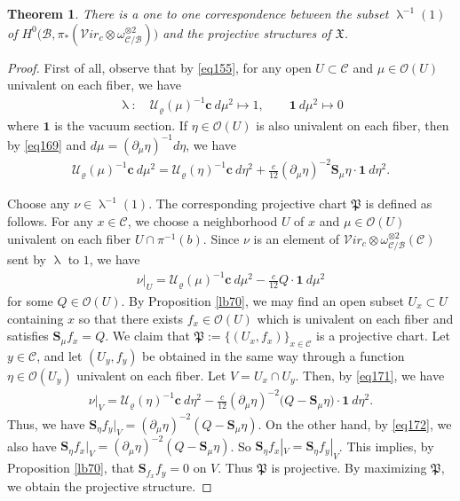 \documentclass[12pt,b5paper,notitlepage]{report}
\theoremstyle{definition}
\theoremstyle{plain}
\newtheorem{thm}[df]{Theorem}
\newcommand{\fk}{\mathfrak}
\newcommand{\mc}{\mathcal}
\newcommand{\id}{\mathbf{1}}
\newcommand{\scr}{\mathscr}
\newcommand{\cbf}{\mathbf c}
\newcommand{\svir}{\mathcal V\!\mathit{ir}}
\newcommand{\Sbf}{\mathbf{S}}
\numberwithin{equation}{section}
\begin{document}
\begin{thm}\label{lb72}
There is a one to one correspondence between the subset $\uplambda^{-1}(1)$ of $H^0\big(\mc B,\pi_*(\svir_c\otimes \omega_{\mc C/\mc B}^{\otimes 2})\big)$ and  the projective structures of $\fk X$.
\end{thm}

\begin{proof}
First of all, observe that by \eqref{eq155}, for any open $U\subset \mc C$ and $\mu\in\scr O(U)$ univalent on each fiber, we have
\begin{gather*}
\uplambda:\quad \mc U_\varrho(\mu)^{-1}\cbf ~d\mu^2\mapsto 1,\qquad \id ~d\mu^2\mapsto 0
\end{gather*}
where $\id$ is the vacuum section. If $\eta\in\scr O(U)$ is also univalent on each fiber, then by \eqref{eq169} and $d\mu=(\partial_\mu\eta)^{-1} d\eta$, we have
\begin{align}
\mc U_\varrho(\mu)^{-1}\cbf~d\mu^2=\mc U_\varrho(\eta)^{-1}\cbf~d\eta^2+\frac {c}{12}(\partial_\mu\eta)^{-2}\Sbf_\mu\eta \cdot \id~d\eta^2.\label{eq171}
\end{align}


Choose any $\nu\in\uplambda^{-1}(1)$. The corresponding projective chart $\fk P$ is defined as follows. For any $x\in\mc C$, we choose a neighborhood $U$ of $x$ and  $\mu\in\scr O(U)$ univalent on each fiber $U\cap\pi^{-1}(b)$. Since $\nu$ is an element of $\svir_c\otimes \omega_{\mc C/\mc B}^{\otimes 2}(\mc C)$ sent by $\uplambda$ to $1$, we have
\begin{gather}
\nu|_U=\mc U_\varrho(\mu)^{-1}\cbf ~d\mu^2-\frac{c}{12}Q\cdot \id~d\mu^2 \label{eq173}
\end{gather} 
for some $Q\in\scr O(U)$. By Proposition \ref{lb70}, we may find an open subset $U_x\subset U$ containing $x$ so that there exists $f_x\in\scr O(U)$ which is univalent on each fiber and satisfies $\Sbf_\mu f_x=Q$. We claim that $\fk P:=\{(U_x,f_x)\}_{x\in\mc C}$ is a projective chart. Let $y\in \mc C$, and let $(U_y,f_y)$ be obtained in the same way through a function $\eta\in\scr O(U_y)$ univalent on each fiber. Let $V=U_x\cap U_y$. Then, by \eqref{eq171}, we have
\begin{gather*}
\nu|_V=\mc U_\varrho(\eta)^{-1}\cbf ~d\eta^2-\frac{c}{12}(\partial_\mu\eta)^{-2}\big(Q-\Sbf_\mu\eta\big)\cdot\id~d\eta^2.
\end{gather*}
Thus,  we have $\Sbf_\eta f_y|_V=(\partial_\mu\eta)^{-2}(Q-\Sbf_\mu\eta)$. On the other hand, by \eqref{eq172}, we also have $\Sbf_\eta f_x|_V=(\partial_\mu\eta)^{-2}(Q-\Sbf_\mu\eta)$. So $\Sbf_\eta f_x|_V=\Sbf_\eta f_y|_V$. This implies, by Proposition \ref{lb70}, that $\Sbf_{f_x}f_y=0$ on $V$. Thus $\fk P$ is projective. By maximizing $\fk P$, we obtain the projective structure.


\end{proof}
\end{document}
